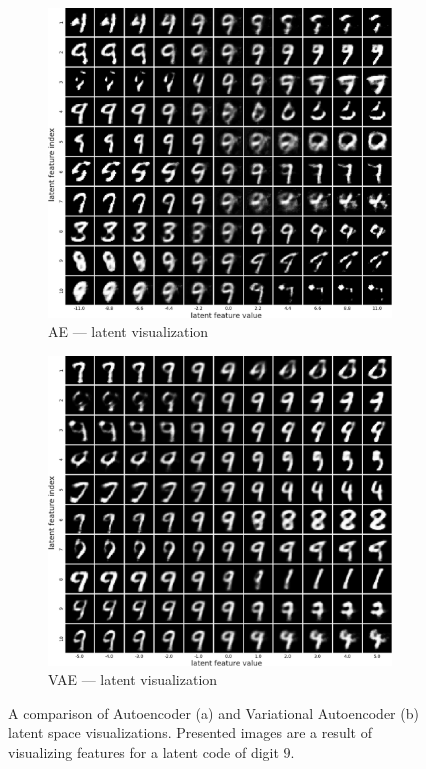 \begin{figure}[]
     \centering
     \begin{subfigure}[b]{0.49\textwidth}
         \centering
         \includegraphics[width=\textwidth]{observational/img/vae/ae_latent_viz.png}
         \caption{AE — latent visualization}
     \end{subfigure} 
     \hfill
     \begin{subfigure}[b]{0.49\textwidth}
          \includegraphics[width=\textwidth]{observational/img/vae/vae_latent_viz.png}
         \caption{VAE — latent visualization}
     \end{subfigure} 
     \caption[Comparison of AE and VAE latent visualizations]{A comparison of Autoencoder (a) and Variational Autoencoder (b) latent space visualizations. Presented images are a result of visualizing features for a latent code of digit $9$.}
    \label{fig:vae-latent-viz}
\end{figure}

